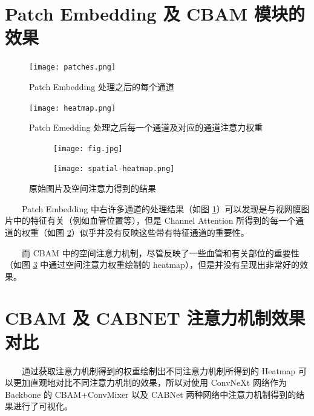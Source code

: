 \documentclass[twocolumn, fontsize=10pt]{article}
\begin{document}
\onecolumn
\begin{appendices}

\section{Patch Embedding 及 CBAM 模块的效果}


\begin{figure}[H]
    \centering
    \texttt{[image: patches.png]}
    \caption{Patch Embedding 处理之后的每个通道}
    \label{fig:patches}
\end{figure}

\begin{figure}[H]
    \centering
    \texttt{[image: heatmap.png]}
    \caption{Patch Emedding 处理之后每一个通道及对应的通道注意力权重}
    \label{fig:heatmap}
\end{figure}

\begin{figure}[H]
    \centering
    \begin{subfigure}[b]{0.2\textwidth}
        \raggedleft
        \texttt{[image: fig.jpg]}
    \end{subfigure}
    \hspace{5mm}
    \begin{subfigure}[b]{0.2\textwidth}
        \raggedright
        \texttt{[image: spatial-heatmap.png]}
    \end{subfigure}
    
    \caption{原始图片及空间注意力得到的结果}
    \label{fig:spatial_attention}
\end{figure}

　　Patch Embedding 中右许多通道的处理结果（如图 \ref{fig:patches}）可以发现是与视网膜图片中的特征有关（例如血管位置等），但是 Channel Attention 所得到的每一个通道的权重（如图 \ref{fig:heatmap}）似乎并没有反映这些带有特征通道的重要性。

　　而 CBAM 中的空间注意力机制，尽管反映了一些血管和有关部位的重要性（如图 \ref{fig:spatial_attention} 中通过空间注意力权重绘制的 heatmap），但是并没有呈现出非常好的效果。

\section{CBAM 及 CABNET 注意力机制效果对比}

　　通过获取注意力机制得到的权重绘制出不同注意力机制所得到的 Heatmap 可以更加直观地对比不同注意力机制的效果，所以对使用 ConvNeXt 网络作为 Backbone 的 CBAM+ConvMixer 以及 CABNet 两种网络中注意力机制得到的结果进行了可视化。


\end{appendices}
\end{document}
